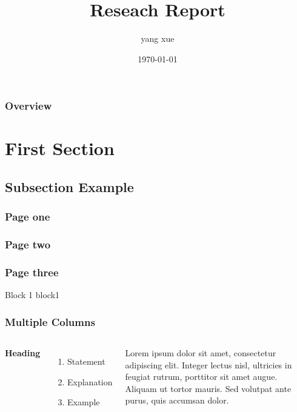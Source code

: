 \documentclass[xetex]{beamer}
\title[]{Reseach Report}
\author{yang xue}
\institute[SCU] 
{
Sichuan University \\ 
\medskip
}
\date{\today}
\begin{document}
\begin{frame}
\titlepage 
\end{frame}
\begin{frame}
\frametitle{Overview} 
\tableofcontents 
\end{frame}



\section{First Section}
\subsection{Subsection Example} 

\begin{frame}
\frametitle{Page one}
\end{frame}

\begin{frame}
\frametitle{Page two}
\end{frame}

\begin{frame}
\frametitle{Page three}
  \begin{block}{Block 1}
  block1
  \end{block}
\end{frame}


\begin{frame}
\frametitle{Multiple Columns}
\begin{columns}[c] %

\textbf{Heading}
\begin{enumerate}
\item Statement
\item Explanation
\item Example
\end{enumerate}

Lorem ipsum dolor sit amet, consectetur adipiscing elit. Integer lectus nisl, ultricies in feugiat rutrum, porttitor sit amet augue. Aliquam ut tortor mauris. Sed volutpat ante purus, quis accumsan dolor.

\end{columns}
\end{frame}
\end{document}
